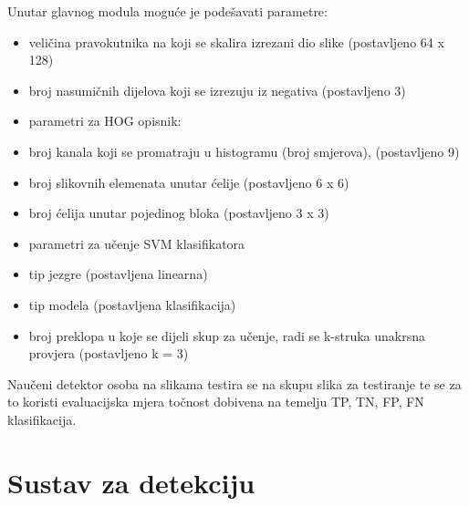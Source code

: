 \documentclass[times, utf8, seminar, numeric]{fer}
\begin{document}
Unutar glavnog modula moguće je podešavati parametre:
\begin{itemize}
\item veličina pravokutnika na koji se skalira izrezani dio slike (postavljeno 64 x 128)
\item broj nasumičnih dijelova koji se izrezuju iz negativa (postavljeno 3)
\item parametri za HOG opisnik:
\item broj kanala koji se promatraju u histogramu (broj smjerova), (postavljeno 9)
\item broj slikovnih elemenata unutar ćelije (postavljeno 6 x 6)
\item broj ćelija unutar pojedinog bloka (postavljeno 3 x 3)
\item parametri za učenje SVM klasifikatora
\item tip jezgre (postavljena linearna)
\item tip modela (postavljena klasifikacija)
\item broj preklopa u koje se dijeli skup za učenje, radi se k-struka unakrsna provjera (postavljeno k = 3)
\end{itemize}

Naučeni detektor osoba na slikama testira se na skupu slika za testiranje te se za to koristi evaluacijska mjera točnost dobivena na temelju TP, TN, FP, FN klasifikacija. 


\section{Sustav za detekciju}
\end{document}
